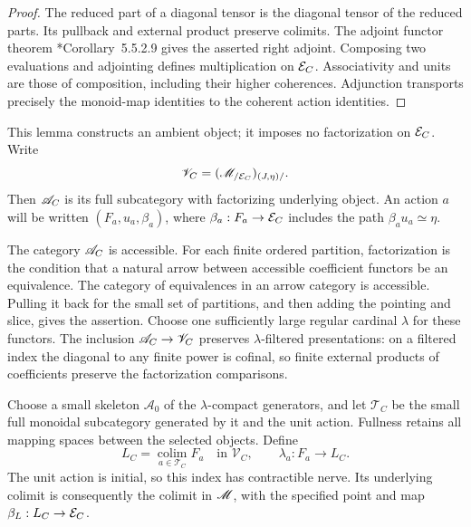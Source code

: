 \begin{proof}
The reduced part of a diagonal tensor is the diagonal tensor
of the reduced parts. Its pullback and external product
preserve colimits. The adjoint functor theorem
\cite{LurieHTT}*{Corollary~5.5.2.9} gives the asserted
right adjoint. Composing two evaluations and
adjointing defines multiplication on $\mathcal E_C$. Associativity
and units are those of composition, including their higher
coherences. Adjunction transports precisely the monoid-map
identities to the coherent action identities.
\end{proof}

This lemma constructs an ambient object; it imposes no
factorization on $\mathcal E_C$. Write
\[
 \mathscr V_C=(\mathscr M_{/\mathcal E_C})_{(J,\eta)/}.
\]
Then $\mathscr A_C$ is its full subcategory with factorizing
underlying object. An action $a$ will be written
$(F_a,u_a,\beta_a)$, where $\beta_a:F_a\to\mathcal E_C$ includes
the path $\beta_a u_a\simeq\eta$.

The category $\mathscr A_C$ is accessible. For each finite ordered
partition, factorization is the condition that a natural
arrow between accessible coefficient functors be an
equivalence. The category of equivalences in an arrow
category is accessible. Pulling it back for the small set
of partitions, and then adding the pointing and slice,
gives the assertion. Choose one sufficiently large regular
cardinal $\lambda$ for these functors. The inclusion
$\mathscr A_C\to\mathscr V_C$ preserves $\lambda$-filtered
presentations: on a filtered index the diagonal to any
finite power is cofinal, so finite external products of
coefficients preserve the factorization comparisons.

Choose a small skeleton $\mathscr A_0$ of the
$\lambda$-compact generators, and let $\mathscr T_C$ be
the small full monoidal subcategory generated by it and
the unit action. Fullness retains all mapping spaces
between the selected objects. Define
\begin{equation}\label{eq:vol2-density-object}
 L_C=\operatorname*{colim}_{a\in\mathscr T_C}F_a
            \quad\text{in }\mathscr V_C,
 \qquad \lambda_a:F_a\to L_C.
\end{equation}
The unit action is initial, so this index has contractible
nerve. Its underlying colimit is consequently the colimit
in $\mathscr M$, with the specified point and map
$\beta_L:L_C\to\mathcal E_C$.

